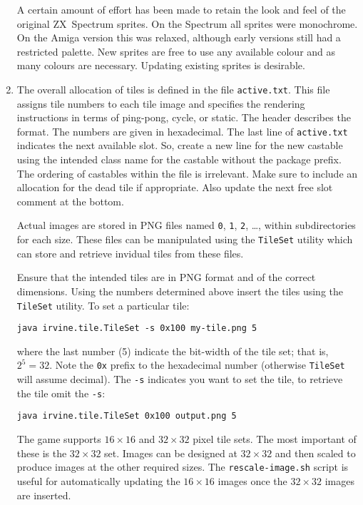 \documentclass{article}
\begin{document}
\begin{enumerate}
  A certain amount of effort has been made to retain the look and feel of the original ZX~Spectrum sprites. On the Spectrum all sprites were monochrome. On the Amiga version this was relaxed, although early versions still had a restricted palette. New sprites are free to use any available colour and as many colours are necessary. Updating existing sprites is desirable.

\item The overall allocation of tiles is defined in the file {\tt active.txt}.  This file assigns tile numbers to each tile image and specifies the rendering instructions in terms of ping-pong, cycle, or static.  The header describes the format. The numbers are given in hexadecimal. The last line of {\tt active.txt} indicates the next available slot.  So, create a new line for the new castable using the intended class name for the castable without the package prefix.  The ordering of castables within the file is irrelevant. Make sure to include an allocation for the dead tile if appropriate. Also update the next free slot comment at the bottom.

  Actual images are stored in PNG files named {\tt 0}, {\tt 1}, {\tt 2}, \ldots, within subdirectories for each size. These files can be manipulated using the {\tt TileSet} utility which can store and retrieve invidual tiles from these files.

  Ensure that the intended tiles are in PNG format and of the correct dimensions. Using the numbers determined above insert the tiles using the {\tt TileSet} utility. To set a particular tile:

  \begin{center}
    {\small\tt java irvine.tile.TileSet -s 0x100 my-tile.png 5}
  \end{center}

  \noindent where the last number (5) indicate the bit-width of the tile set; that is, $2^5=32$. Note the {\tt 0x} prefix to the hexadecimal number (otherwise {\tt TileSet} will assume decimal). The {\tt -s} indicates you want to set the tile, to retrieve the tile omit the {\tt -s}:

  \begin{center}
    {\small\tt java irvine.tile.TileSet 0x100 output.png 5}
  \end{center}

  The game supports $16\times16$ and $32\times32$ pixel tile sets. The most important of these is the $32\times32$ set.  Images can be designed at $32\times32$ and then scaled to produce images at the other required sizes.  The {\tt rescale-image.sh} script is useful for automatically updating the $16\times16$ images once the $32\times32$ images are inserted.


\end{enumerate}
\end{document}

